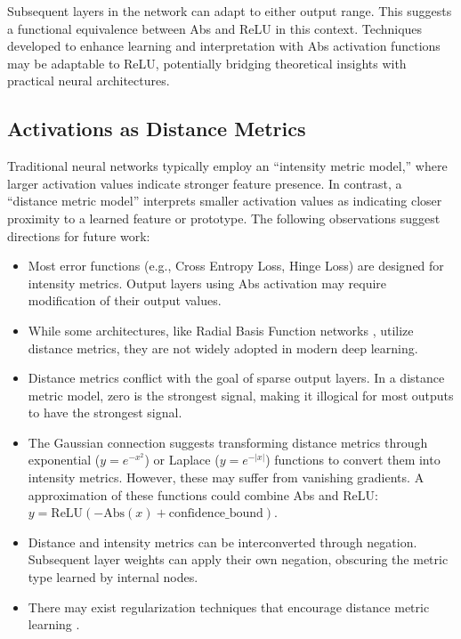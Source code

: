 Subsequent layers in the network can adapt to either output range. This suggests a functional equivalence between Abs and ReLU in this context. Techniques developed to enhance learning and interpretation with Abs activation functions may be adaptable to ReLU, potentially bridging theoretical insights with practical neural architectures.

\subsection{Activations as Distance Metrics}

Traditional neural networks typically employ an ``intensity metric model,'' where larger activation values indicate stronger feature presence. In contrast, a ``distance metric model'' interprets smaller activation values as indicating closer proximity to a learned feature or prototype. The following observations suggest directions for future work:

\begin{itemize}
    \item Most error functions (e.g., Cross Entropy Loss, Hinge Loss) are designed for intensity metrics. Output layers using Abs activation may require modification of their output values.
    \item While some architectures, like Radial Basis Function networks \citep{broomhead1988radial}, utilize distance metrics, they are not widely adopted in modern deep learning.
    \item Distance metrics conflict with the goal of sparse output layers. In a distance metric model, zero is the strongest signal, making it illogical for most outputs to have the strongest signal.
    \item The Gaussian connection suggests transforming distance metrics through exponential ($y=e^{-x^2}$) or Laplace ($y=e^{-|x|}$) functions to convert them into intensity metrics. However, these may suffer from vanishing gradients. A approximation of these functions could combine Abs and ReLU: $y=\text{ReLU}(-\text{Abs}(x) + \text{confidence\_bound})$.
    \item Distance and intensity metrics can be interconverted through negation. Subsequent layer weights can apply their own negation, obscuring the metric type learned by internal nodes.
    \item There may exist regularization techniques that encourage distance metric learning \citep{weinberger2009distance}.
\end{itemize}

